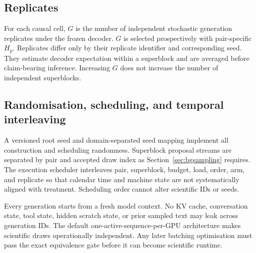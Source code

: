\documentclass[11pt,a4paper]{article}
\begin{document}
\subsection{Replicates}
For each causal cell, $G$ is the number of independent stochastic generation replicates under the frozen decoder. $G$ is selected prospectively with pair-specific $H_p$. Replicates differ only by their replicate identifier and corresponding seed. They estimate decoder expectation within a superblock and are averaged before claim-bearing inference. Increasing $G$ does not increase the number of independent superblocks.

\subsection{Randomisation, scheduling, and temporal interleaving}
A versioned root seed and domain-separated seed mapping implement all construction and scheduling randomness. Superblock proposal streams are separated by pair and accepted draw index as Section~\ref{sec:bgsampling} requires. The execution scheduler interleaves pair, superblock, budget, load, order, arm, and replicate so that calendar time and machine state are not systematically aligned with treatment. Scheduling order cannot alter scientific IDs or seeds.

Every generation starts from a fresh model context. No KV cache, conversation state, tool state, hidden scratch state, or prior sampled text may leak across generation IDs. The default one-active-sequence-per-GPU architecture makes scientific draws operationally independent. Any later batching optimisation must pass the exact equivalence gate before it can become scientific runtime.
\end{document}
